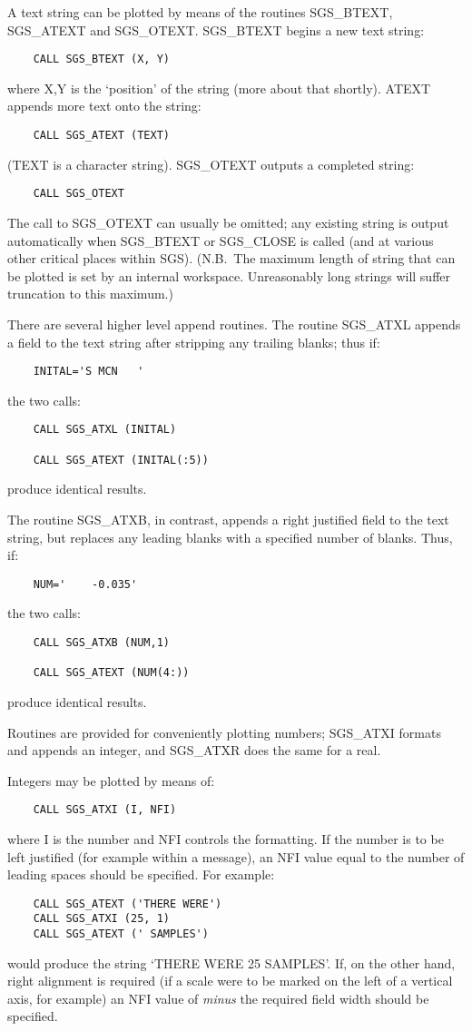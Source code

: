 A text string can be plotted by means of the
routines SGS\_BTEXT, SGS\_ATEXT and SGS\_OTEXT.  SGS\_BTEXT begins a new 
text string:
\begin{verbatim}
    CALL SGS_BTEXT (X, Y)
\end{verbatim}
where X,Y is the `position' of the string (more about that
shortly).  ATEXT appends more text onto the string:
\begin{verbatim}
    CALL SGS_ATEXT (TEXT)
\end{verbatim}
(TEXT is a character string).  SGS\_OTEXT outputs a completed string:
\begin{verbatim}
    CALL SGS_OTEXT
\end{verbatim}
The call to SGS\_OTEXT can usually be omitted;  any existing string
is output automatically when SGS\_BTEXT or SGS\_CLOSE is called (and
at various other critical places within SGS).
(N.B.\ The maximum length of string that can be plotted is set by
an internal workspace.  Unreasonably long strings will suffer
truncation to this maximum.)

There are several higher level append routines.
The routine SGS\_ATXL
appends a field to the text string after stripping any trailing
blanks;  thus if:
\begin{verbatim}
    INITAL='S MCN   '
\end{verbatim}
the two calls:
\begin{verbatim}
    CALL SGS_ATXL (INITAL)

    CALL SGS_ATEXT (INITAL(:5))
\end{verbatim}
produce identical results.

The routine SGS\_ATXB, in contrast, appends a right justified
field to the text string, but replaces any leading blanks with a
specified number of blanks.  Thus, if:
\begin{verbatim}
    NUM='    -0.035'
\end{verbatim}
the two calls:
\begin{verbatim}
    CALL SGS_ATXB (NUM,1)

    CALL SGS_ATEXT (NUM(4:))
\end{verbatim}
produce identical results.

Routines are provided for conveniently plotting numbers;  SGS\_ATXI
formats and appends an integer, and SGS\_ATXR does the same for a
real.

Integers may be plotted by means of:
\begin{verbatim}
    CALL SGS_ATXI (I, NFI)
\end{verbatim}
where I is the number and NFI controls the formatting.  If the number
is to be left justified (for example within a message), an NFI value
equal to the number of leading spaces should be specified.  For
example:
\begin{verbatim}
    CALL SGS_ATEXT ('THERE WERE')
    CALL SGS_ATXI (25, 1)
    CALL SGS_ATEXT (' SAMPLES')
\end{verbatim}
would produce the string `THERE WERE 25 SAMPLES'.  If, on
the other hand, right alignment is required (if a
scale were to be marked
on the left of a vertical axis, for example) an NFI value of {\em minus}
the required field width should be specified.

